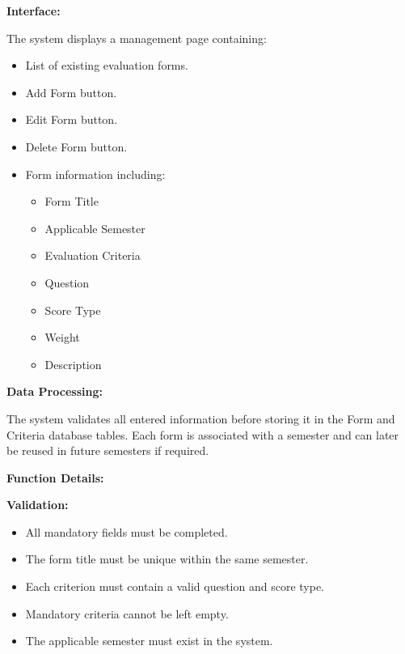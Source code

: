 \vspace{0.2cm}

\textbf{Interface:}

The system displays a management page containing:

\begin{itemize}
    \item List of existing evaluation forms.
    \item Add Form button.
    \item Edit Form button.
    \item Delete Form button.
    \item Form information including:
    \begin{itemize}
        \item Form Title
        \item Applicable Semester
        \item Evaluation Criteria
        \item Question
        \item Score Type
        \item Weight
        \item Description
    \end{itemize}
\end{itemize}

\vspace{0.2cm}

\textbf{Data Processing:}

The system validates all entered information before storing it in the Form and Criteria database tables. Each form is associated with a semester and can later be reused in future semesters if required.

\vspace{0.3cm}

\textbf{Function Details:}

\textbf{Validation:}

\begin{itemize}
    \item All mandatory fields must be completed.
    \item The form title must be unique within the same semester.
    \item Each criterion must contain a valid question and score type.
    \item Mandatory criteria cannot be left empty.
    \item The applicable semester must exist in the system.
\end{itemize}

